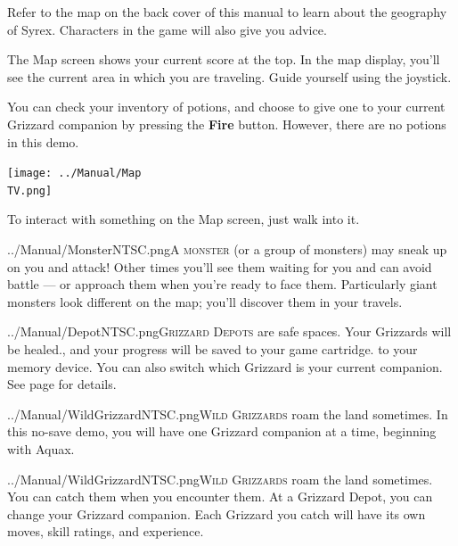 \documentclass[10pt,twocolumn,openany,article]{memoir}
\newcommand\TV{NTSC} %
\begin{document}
Refer to  the map on the  back cover of  this manual to learn  about the
geography of Syrex. Characters in the game will also give you advice.

The Map screen shows your current score  at the top. In the map display,
you'll see the  current area in which you are  traveling. Guide yourself
using the joystick.

You can check your inventory of potions,  and choose to give one to your
current  Grizzard  companion  by   pressing  the  \textbf{Fire}  button.
\ifdefined\DEMO However, there are no potions in this demo. \fi

\begin{center}
  \texttt{[image: ../Manual/Map\\TV.png]}
\end{center}

To interact with something on the Map screen, just walk into it.

\lettrine[image=true,                lines=5,               findent=3pt,
nindent=3pt]{../Manual/Monster\TV.png}{A   monster}  (or   a  group   of
monsters) may  sneak up on you  and attack! Other times  you'll see them
waiting for  you and can avoid  battle --- or approach  them when you're
ready to  face them. Particularly  giant monsters look different  on the
map; you'll discover them in your travels.

\lettrine[image=true,                lines=5,               findent=3pt,
nindent=3pt]{../Manual/Depot\TV.png}{Grizzard  Depots} are  safe spaces.
Your  Grizzards will  be  healed\ifdefined\NOSAVE{}.{}\else{}, and  your
progress will  be saved \ifdefined\ATARIAGESAVE to  your game cartridge.
\else to your  memory device. \fi You can also  switch which Grizzard is
your  current   companion.  \fi  See   page  \pageref{sec:GrizzardDepot}
for details.

\ifdefined\ATARIAGESAVE\pagebreak\fi

\ifdefined\NOSAVE

\lettrine[image=true,                lines=5,               findent=3pt,
nindent=3pt]{../Manual/WildGrizzard\TV.png}{Wild  Grizzards}   roam  the
land  sometimes.  In this  no-save  demo,  you  will have  one  Grizzard
companion at a time, beginning with Aquax.

\else

\lettrine[image=true,                lines=5,               findent=3pt,
nindent=3pt]{../Manual/WildGrizzard\TV.png}{Wild  Grizzards}   roam  the
land  sometimes.   You  can   catch  them   when  you   encounter  them.
At  a   Grizzard  Depot,  you   can  change  your   Grizzard  companion.
Each  Grizzard  you  catch  will  have its  own  moves,  skill  ratings,
and experience.
\end{document}
